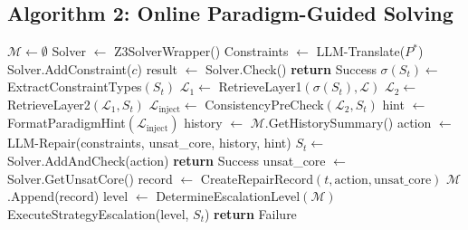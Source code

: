 \subsection{Algorithm 2: Online Paradigm-Guided Solving}

\begin{algorithm}
\caption{PRISM-Online($P^*$, $\mathcal{L}$, LLM, Z3, $\tau_{\text{stag}}$, $\tau_{\text{loop}}$)}
\begin{algorithmic}[1]
\STATE $\mathcal{M} \leftarrow \emptyset$ \quad {}
\STATE Solver $\leftarrow$ Z3SolverWrapper()
\STATE Constraints $\leftarrow$ LLM-Translate($P^*$)
    \STATE Solver.AddConstraint($c$)
\ENDFOR
\STATE result $\leftarrow$ Solver.Check()
    \STATE \textbf{return} Success
\ENDIF
\STATE {}
    \STATE $\sigma(S_t) \leftarrow$ ExtractConstraintTypes$(S_t)$
    \STATE $\mathcal{L}_1 \leftarrow$ RetrieveLayer1$(\sigma(S_t), \mathcal{L})$
    \STATE $\mathcal{L}_2 \leftarrow$ RetrieveLayer2$(\mathcal{L}_1, S_t)$ \quad {}
    \STATE $\mathcal{L}_{\text{inject}} \leftarrow$ ConsistencyPreCheck$(\mathcal{L}_2, S_t)$
    \STATE hint $\leftarrow$ FormatParadigmHint$(\mathcal{L}_{\text{inject}})$
    \STATE history $\leftarrow$ $\mathcal{M}$.GetHistorySummary()
    \STATE action $\leftarrow$ LLM-Repair(constraints, unsat\_core, history, hint)
    \STATE $S_t \leftarrow$ Solver.AddAndCheck(action)
        \STATE \textbf{return} Success
    \ELSE
        \STATE unsat\_core $\leftarrow$ Solver.GetUnsatCore()
        \STATE record $\leftarrow$ CreateRepairRecord$(t, \text{action}, \text{unsat\_core})$
        \STATE $\mathcal{M}$.Append(record)
            \STATE level $\leftarrow$ DetermineEscalationLevel$(\mathcal{M})$
            \STATE ExecuteStrategyEscalation(level, $S_t$)
        \ENDIF
    \ENDIF
\ENDFOR
\STATE \textbf{return} Failure
\end{algorithmic}
\end{algorithm}
